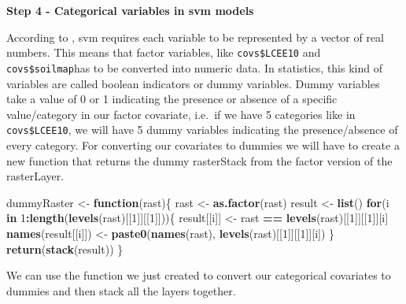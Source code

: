 \documentclass[10pt,b5paper,]{book}
\newenvironment{Shaded}{\begin{snugshade}}{\end{snugshade}}
\newcommand{\CommentTok}[1]{\textcolor[rgb]{0.56,0.35,0.01}{\textit{#1}}}
\newcommand{\ControlFlowTok}[1]{\textcolor[rgb]{0.13,0.29,0.53}{\textbf{#1}}}
\newcommand{\DecValTok}[1]{\textcolor[rgb]{0.00,0.00,0.81}{#1}}
\newcommand{\KeywordTok}[1]{\textcolor[rgb]{0.13,0.29,0.53}{\textbf{#1}}}
\newcommand{\NormalTok}[1]{#1}
\newcommand{\OperatorTok}[1]{\textcolor[rgb]{0.81,0.36,0.00}{\textbf{#1}}}
\newcommand{\StringTok}[1]{\textcolor[rgb]{0.31,0.60,0.02}{#1}}
\theoremstyle{definition}
\theoremstyle{definition}
\theoremstyle{definition}
\theoremstyle{remark}
\begin{document}
\textbf{Step 4 - Categorical variables in svm models}

According to \citet{hsu2003practical}, svm requires each variable to be
represented by a vector of real numbers. This means that factor
variables, like \texttt{covs\$LCEE10} and \texttt{covs\$soilmap}has to
be converted into numeric data. In statistics, this kind of variables
are called boolean indicators or dummy variables. Dummy variables take a
value of 0 or 1 indicating the presence or absence of a specific
value/category in our factor covariate, i.e.~if we have 5 categories
like in \texttt{covs\$LCEE10}, we will have 5 dummy variables indicating
the presence/absence of every category. For converting our covariates to
dummies we will have to create a new function that returns the dummy
rasterStack from the factor version of the rasterLayer.

\begin{Shaded}
\begin{Highlighting}[]
\NormalTok{dummyRaster <-}\StringTok{ }\ControlFlowTok{function}\NormalTok{(rast)\{}
\NormalTok{  rast <-}\StringTok{ }\KeywordTok{as.factor}\NormalTok{(rast)}
\NormalTok{  result <-}\StringTok{ }\KeywordTok{list}\NormalTok{()}
  \ControlFlowTok{for}\NormalTok{(i }\ControlFlowTok{in} \DecValTok{1}\OperatorTok{:}\KeywordTok{length}\NormalTok{(}\KeywordTok{levels}\NormalTok{(rast)[[}\DecValTok{1}\NormalTok{]][[}\DecValTok{1}\NormalTok{]]))\{}
\NormalTok{    result[[i]] <-}\StringTok{ }\NormalTok{rast }\OperatorTok{==}\StringTok{ }\KeywordTok{levels}\NormalTok{(rast)[[}\DecValTok{1}\NormalTok{]][[}\DecValTok{1}\NormalTok{]][i]}
    \KeywordTok{names}\NormalTok{(result[[i]]) <-}\StringTok{ }\KeywordTok{paste0}\NormalTok{(}\KeywordTok{names}\NormalTok{(rast), }
                                 \KeywordTok{levels}\NormalTok{(rast)[[}\DecValTok{1}\NormalTok{]][[}\DecValTok{1}\NormalTok{]][i])}
\NormalTok{  \}}
  \KeywordTok{return}\NormalTok{(}\KeywordTok{stack}\NormalTok{(result))}
\NormalTok{\}}
\end{Highlighting}
\end{Shaded}

We can use the function we just created to convert our categorical
covariates to dummies and then stack all the layers together.

\begin{Shaded}
\end{Shaded}
\end{document}

